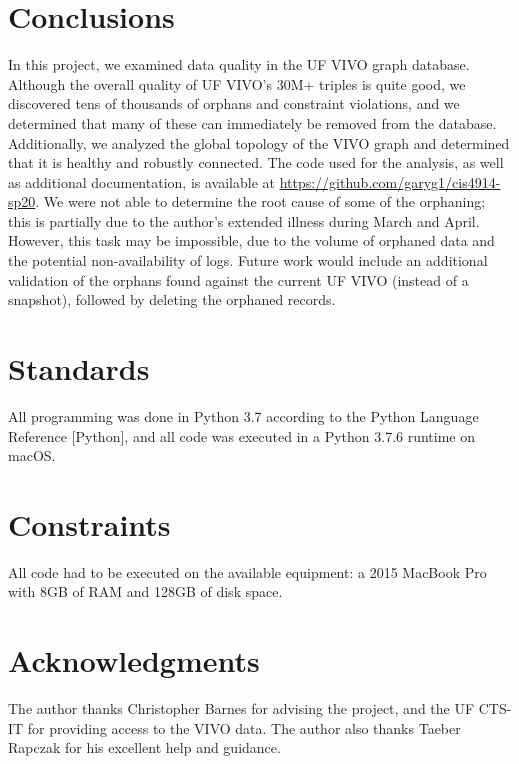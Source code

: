 \documentclass[11pt]{article}
\begin{document}
\section*{Conclusions}
In this project, we examined data quality in the UF VIVO graph database. Although the overall quality of UF VIVO's 30M+ triples is quite good, we discovered tens of thousands of orphans and constraint violations, and we determined that many of these can immediately be removed from the database. Additionally, we analyzed the global topology of the VIVO graph and determined that it is healthy and robustly connected. The code used for the analysis, as well as additional documentation, is available at \url{https://github.com/garyg1/cis4914-sp20}. We were not able to determine the root cause of some of the orphaning; this is partially due to the author's extended illness during March and April. However, this task may be impossible, due to the volume of orphaned data and the potential non-availability of logs. Future work would include an additional validation of the orphans found against the current UF VIVO (instead of a snapshot), followed by deleting the orphaned records.

\section*{Standards}
All programming was done in Python 3.7 according to the Python Language Reference [Python], and all code was executed in a Python 3.7.6 runtime on macOS.

\section*{Constraints}
All code had to be executed on the available equipment: a 2015 MacBook Pro with 8GB of RAM and 128GB of disk space. 

% 

\section*{Acknowledgments}
The author thanks Christopher Barnes for advising the project, and the UF CTS-IT for providing access to the VIVO data. The author also thanks Taeber Rapczak for his excellent help and guidance.
\end{document}
